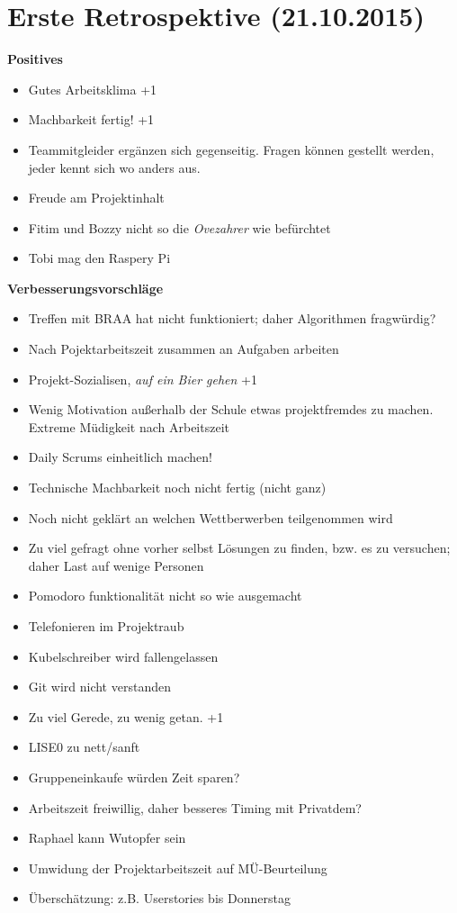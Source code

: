 \chapter{Erste Retrospektive (21.10.2015)}

\textbf{Positives}
\begin{itemize}
	\item Gutes Arbeitsklima +1
	\item Machbarkeit fertig! +1
	\item Teammitgleider ergänzen sich gegenseitig. Fragen können gestellt werden, jeder kennt sich wo anders aus.
	\item Freude am Projektinhalt
	\item Fitim und Bozzy nicht so die \textit{Ovezahrer} wie befürchtet
	\item Tobi mag den Raspery Pi
\end{itemize}

\textbf{Verbesserungsvorschläge}
\begin{itemize}
	\item Treffen mit BRAA hat nicht funktioniert; daher Algorithmen fragwürdig?
	\item Nach Pojektarbeitszeit zusammen an Aufgaben arbeiten
	\item Projekt-Sozialisen, \textit{auf ein Bier gehen} +1
	\item Wenig Motivation außerhalb der Schule etwas projektfremdes zu machen. Extreme Müdigkeit nach Arbeitszeit
	\item Daily Scrums einheitlich machen!
	\item Technische Machbarkeit noch nicht fertig (nicht ganz)
	\item Noch nicht geklärt an welchen Wettberwerben teilgenommen wird
	\item Zu viel gefragt ohne vorher selbst Lösungen zu finden, bzw. es zu versuchen; daher Last auf wenige Personen
	\item Pomodoro funktionalität nicht so wie ausgemacht
	\item Telefonieren im Projektraub
	\item Kubelschreiber wird fallengelassen
	\item Git wird nicht verstanden
	\item Zu viel Gerede, zu wenig getan. +1
	\item LISE0 zu nett/sanft
	\item Gruppeneinkaufe würden Zeit sparen?
	\item Arbeitszeit freiwillig, daher besseres Timing mit Privatdem?
	\item Raphael kann Wutopfer sein
	\item Umwidung der Projektarbeitszeit auf MÜ-Beurteilung
	\item Überschätzung: z.B. Userstories bis Donnerstag
\end{itemize}

